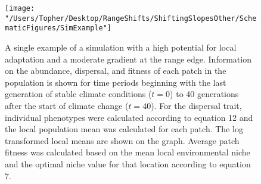 \documentclass[11pt, oneside]{article}
\begin{document}
\begin{figure}
\centering
\texttt{[image: "/Users/Topher/Desktop/RangeShifts/ShiftingSlopesOther/SchematicFigures/SimExample"]}
\vspace{-5mm}
\caption[LoF entry]{A single example of a simulation with a high potential for local adaptation and a moderate gradient at the range edge. Information on the abundance, dispersal, and fitness of each patch in the population is shown for time periods beginning with the last generation of stable climate conditions ($t = 0$) to 40 generations after the start of climate change ($t = 40$). For the dispersal trait, individual phenotypes were calculated according to equation 12 and the local population mean was calculated for each patch. The log transformed local means are shown on the graph. Average patch fitness was calculated based on the mean local environmental niche and the optimal niche value for that location according to equation 7.}
\label{fig:SimExample}
\end{figure}
\end{document}
